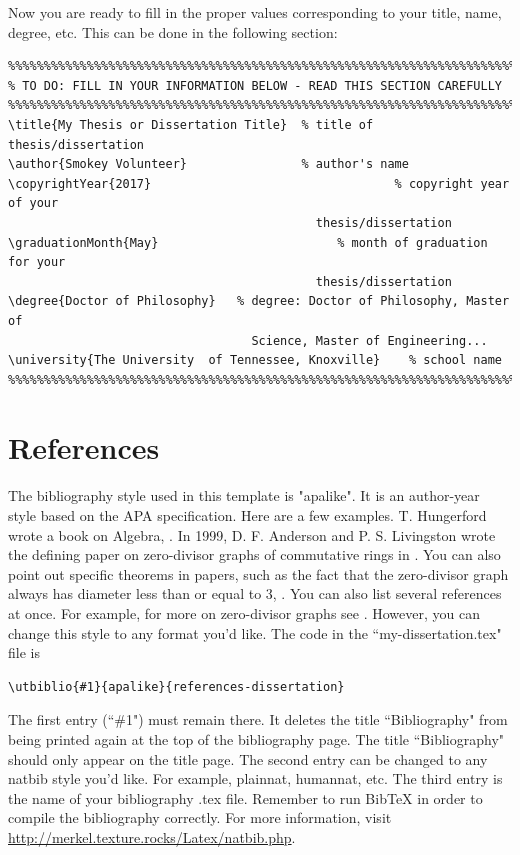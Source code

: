 Now you are ready to fill in the proper values corresponding to your title, name, degree, etc. This can be done in the following section:
\begin{verbatim}
%%%%%%%%%%%%%%%%%%%%%%%%%%%%%%%%%%%%%%%%%%%%%%%%%%%%%%%%%%%%%%%%%%%%%%%%%%%%
% TO DO: FILL IN YOUR INFORMATION BELOW - READ THIS SECTION CAREFULLY
%%%%%%%%%%%%%%%%%%%%%%%%%%%%%%%%%%%%%%%%%%%%%%%%%%%%%%%%%%%%%%%%%%%%%%%%%%%%
\title{My Thesis or Dissertation Title}	 % title of thesis/dissertation
\author{Smokey Volunteer}                % author's name
\copyrightYear{2017}            		 		      % copyright year of your 
                                           thesis/dissertation
\graduationMonth{May}           	     	  % month of graduation for your 
                                           thesis/dissertation
\degree{Doctor of Philosophy}   % degree: Doctor of Philosophy, Master of 
                                  Science, Master of Engineering...
\university{The University  of Tennessee, Knoxville}	% school name
%%%%%%%%%%%%%%%%%%%%%%%%%%%%%%%%%%%%%%%%%%%%%%%%%%%%%%%%%%%%%%%%%%%%%%%%%%%%
\end{verbatim}

\section{References}
The bibliography style used in this template is "apalike". It is an author-year style based on the APA specification. Here are a few examples. T. Hungerford wrote a book on Algebra, \citep{Hungerford1974}. In 1999, D. F. Anderson and P. S. Livingston wrote the defining paper on zero-divisor graphs of commutative rings in \citep{AndersonLivingston1999}. You can also point out specific theorems in papers, such as the fact that the zero-divisor graph always has diameter less than or equal to $3$, \citep[Theorem 2.3]{AndersonLivingston1999}. You can also list several references at once. For example, for more on zero-divisor graphs see \citep{AAS2011,AFLL2001}. However, you can change this style to any format you'd like. The code in the ``my-dissertation.tex" file is 
\begin{verbatim}
\utbiblio{#1}{apalike}{references-dissertation}
\end{verbatim} 
The first entry (``\#1") must remain there. It deletes the title ``Bibliography" from being printed again at the top of the bibliography page. The title ``Bibliography" should only appear on the title page. The second entry can be changed to any natbib style you'd like. For example, plainnat, humannat, etc. The third entry is the name of your bibliography .tex file. Remember to run BibTeX in order to compile the bibliography correctly. For more information, visit \href{http://merkel.texture.rocks/Latex/natbib.php}{http://merkel.texture.rocks/Latex/natbib.php}.

